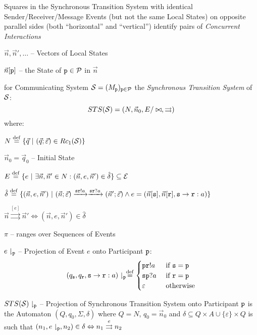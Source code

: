 Squares in the Synchronous Transition System with identical
Sender/Receiver/Message Events (but not the same Local States) on
opposite parallel sides (both ``horizontal'' and ``vertical'')
identify pairs of \emph{Concurrent Interactions}

$\vec{n}, \vec{n}', \ldots$ -- Vectors of Local States

$\vec{n}[\mathtt{p}]$ -- the State of $\mathtt{p} \in \mathcal{P}$ in
$\vec{n}$

for Communicating System $\mathcal{S} =
(M_\mathtt{p})_{\mathtt{p}\in\mathcal{P}}$ the \emph{Synchronous
  Transition System} of $\mathcal{S}$:
\[
  STS(\mathcal{S}) = (N,\vec{n}_0,E/\bowtie,\rightrightarrows)
\]
where:

$N \defeq \{ \vec{q} \ |\ (\vec{q};\vec{\varepsilon}) \in Rc_1(\class{S}) \}$

$\vec{n}_0 = \vec{q}_0$ -- Initial State

$E \stackrel{\mathrm{def}}= \{ e \ |\ \exists\vec{n},\vec{n}' \in N :
  (\vec{n},e,\vec{n}') \in \hat{\delta} \} \subseteq \mathcal{E}$

$\hat{\delta} \stackrel{\mathrm{def}}= \{ (\vec{n},e,\vec{n}')
\ |\ (\vec{n};\vec{\varepsilon})
    \xrightarrow{\mathtt{sr}!a} \xrightarrow{\mathtt{sr}?a}
     (\vec{n}';\vec{\varepsilon}) \wedge
    e = (\vec{n}[\mathtt{s}],\vec{n}[\mathtt{r}],
      \mathtt{s}\rightarrow\mathtt{r}:a)
\}$

$\vec{n} \stackrel{[e]}{\rightrightarrows} \vec{n}' \Leftrightarrow
  (\vec{n},e,\vec{n}') \in \hat{\delta}$

$\pi$ -- ranges over Sequences of Events

$e\downharpoonright_\mathtt{p}$ -- Projection of Event $e$ onto
Participant $\mathtt{p}$:
\[
  (q_\mathtt{s},q_\mathtt{r},\mathtt{s}\rightarrow\mathtt{r}:a)
    \downharpoonright_\mathtt{p}
  \stackrel{\mathrm{def}}= \begin{cases}
    \mathtt{pr}!a &\ \text{if}\ \mathtt{s = p} \\
    \mathtt{sp}?a &\ \text{if}\ \mathtt{r = p} \\
    \varepsilon  &\ \text{otherwise} \\
  \end{cases}
\]

$STS(\mathcal{S})\downharpoonright_\mathtt{p}$ -- Projection of
Synchronous Transition System onto Participant $\mathtt{p}$ is the
Automaton $(Q, q_0, \Sigma, \delta)$ where $Q = N$, $q_0 = \vec{n}_0$
and $\delta \subseteq Q \times A \cup \{ \varepsilon \} \times Q$ is
such that $(n_1, e\downharpoonright_\mathtt{p}, n_2) \in \delta
\Leftrightarrow n_1 \stackrel{e}{\rightrightarrows} n_2$

